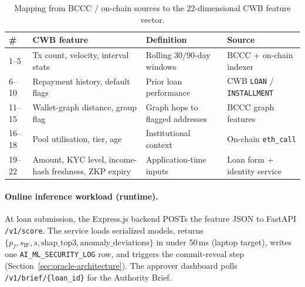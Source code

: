 \documentclass[12pt,a4paper]{report}
\newcommand{\tableheadcolor}{\rowcolor{TableHeadBg}}
\begin{document}
\begin{table}[H]
\centering
\caption[BCCC-to-CWB feature mapping (22-D)]{Mapping from BCCC / on-chain sources to the 22-dimensional CWB feature vector.}
\label{tab:ml-feature-mapping}
\footnotesize
\begin{tabular}{p{0.4cm}p{4.2cm}p{5.8cm}p{3.8cm}}
\toprule
\tableheadcolor
\textbf{\#} & \textbf{CWB feature} & \textbf{Definition} & \textbf{Source} \\
\midrule
1--5 & Tx count, velocity, interval stats & Rolling 30/90-day windows & BCCC + on-chain indexer \\
6--10 & Repayment history, default flags & Prior loan performance & CWB \texttt{LOAN} / \texttt{INSTALLMENT} \\
11--15 & Wallet-graph distance, group flag & Graph hops to flagged addresses & BCCC graph features \\
16--18 & Pool utilisation, tier, age & Institutional context & On-chain \texttt{eth\_call} \\
19--22 & Amount, KYC level, income-hash freshness, ZKP expiry & Application-time inputs & Loan form + identity service \\
\bottomrule
\end{tabular}
\end{table}

\paragraph{Online inference workload (runtime).}
At loan submission, the Express.js backend POSTs the feature JSON to FastAPI \texttt{/v1/score}. The service loads serialized models, returns $\{p_f, s_{\text{IF}}, s, \text{shap\_top3}, \text{anomaly\_deviations}\}$ in under 50\,ms (laptop target), writes one \texttt{AI\_ML\_SECURITY\_LOG} row, and triggers the commit-reveal step (Section~\ref{sec:oracle-architecture}). The approver dashboard polls \texttt{/v1/brief/\{loan\_id\}} for the Authority Brief.
\end{document}
